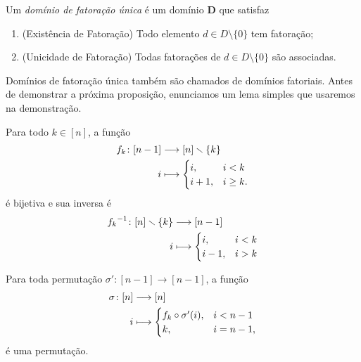 \begin{definition}
Um \emph{domínio de fatoração única} é um domínio $\bm D$ que satisfaz
	\begin{enumerate}
	\item (Existência de Fatoração) Todo elemento $d \in D \setminus \{0\}$ tem fatoração;
	\item (Unicidade de Fatoração) Todas fatorações de $d \in D \setminus \{0\}$ são associadas.
	\end{enumerate}
\end{definition}

Domínios de fatoração única também são chamados de domínios fatoriais. Antes de demonstrar a próxima proposição, enunciamos um lema simples que usaremos na demonstração.

\begin{lemma}
\label{conj:prop:permut.tranlad}
Para todo $k \in [n]$, a função
	\begin{align*}
	{f_k}\colon {[n-1]} &\longrightarrow {[n]\smallsetminus\{k\}} \\{i} &\longmapsto \begin{cases}
		i,& i < k \\
		i+1,& i \geq k.
		\end{cases}
	\end{align*}
é bijetiva e sua inversa é
	\begin{align*}
	{{f_k}^{-1}}\colon {[n]\smallsetminus\{k\}} &\longrightarrow {[n-1]} \\{i} &\longmapsto \begin{cases}
		i,& i < k \\
		i-1,& i > k
		\end{cases}
	\end{align*}

Para toda permutação $\sigma'\colon [n-1] \to [n-1]$, a função
	\begin{align*}
	{\sigma}\colon {[n]} &\longrightarrow {[n]} \\{i} &\longmapsto \begin{cases}
		f_k \circ \sigma' (i), & i < n-1 \\
		k, & i = n-1,
		\end{cases}
	\end{align*}
é uma permutação.
\end{lemma}
